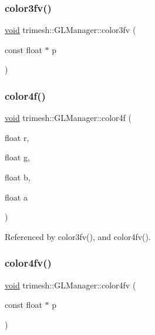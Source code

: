 \subsubsection{\texorpdfstring{color3fv()}{color3fv()}}
{\footnotesize\ttfamily \hyperlink{namespacetrimesh_a784ddfd979e1c579bda795a8edfc3f43}{void} trimesh\+::\+G\+L\+Manager\+::color3fv (\begin{DoxyParamCaption}\item[{const float $\ast$}]{p }\end{DoxyParamCaption})\hspace{0.3cm}{\ttfamily [inline]}}

\mbox{\label{classtrimesh_1_1GLManager_a241d4f1194eab865c7f0d1409577831a}} 
\subsubsection{\texorpdfstring{color4f()}{color4f()}}
{\footnotesize\ttfamily \hyperlink{namespacetrimesh_a784ddfd979e1c579bda795a8edfc3f43}{void} trimesh\+::\+G\+L\+Manager\+::color4f (\begin{DoxyParamCaption}\item[{float}]{r,  }\item[{float}]{g,  }\item[{float}]{b,  }\item[{float}]{a }\end{DoxyParamCaption})}



Referenced by color3fv(), and color4fv().

\mbox{\label{classtrimesh_1_1GLManager_add5dc2f7d3732d3a27c93e1da3d71922}} 
\subsubsection{\texorpdfstring{color4fv()}{color4fv()}}
{\footnotesize\ttfamily \hyperlink{namespacetrimesh_a784ddfd979e1c579bda795a8edfc3f43}{void} trimesh\+::\+G\+L\+Manager\+::color4fv (\begin{DoxyParamCaption}\item[{const float $\ast$}]{p }\end{DoxyParamCaption})\hspace{0.3cm}{\ttfamily [inline]}}

